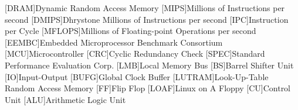 \begin{acronym}[Bash]
[DRAM]{Dynamic Random Access Memory}
 [MIPS]{Millions of Instructions per second}
[DMIPS]{Dhrystone Millions of Instructions per second}
 [IPC]{Instruction per Cycle}
[MFLOPS]{Millions of Floating-point Operations per second}
[EEMBC]{Embedded Microprocessor Benchmark Consortium}
[MCU]{Microcontroller}
[CRC]{Cyclic Redundancy Check}
[SPEC]{Standard Performance Evaluation Corp.}
[LMB]{Local Memory Bus}
[BS]{Barrel Shifter Unit}
[IO]{Input-Output}
[BUFG]{Global Clock Buffer}
[LUTRAM]{Look-Up-Table Random Access Memory}
[FF]{Flip Flop}
[LOAF]{Linux on A Floppy}
[CU]{Control Unit}
[ALU]{Arithmetic Logic Unit}
\end{acronym}
